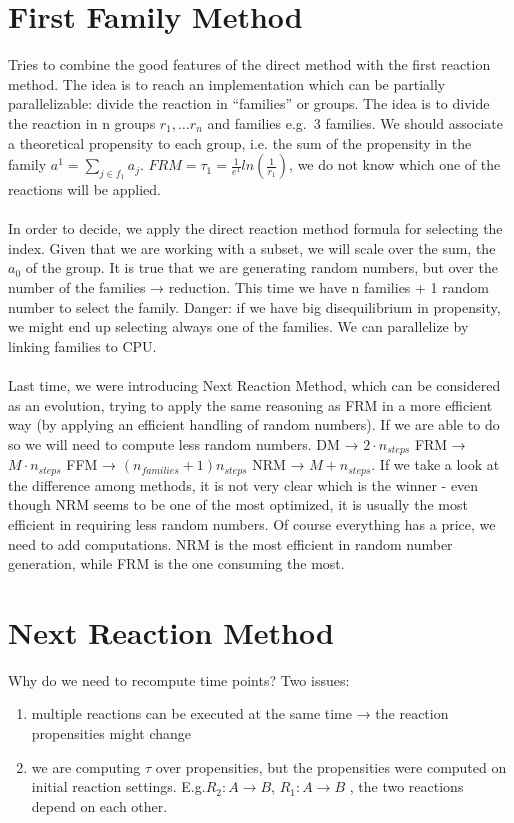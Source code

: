\section{First Family Method}
Tries to combine the good features of the direct method with the first reaction method.
The idea is to reach an implementation which can be partially parallelizable: divide the reaction in ``families'' or groups.
The idea is to divide the reaction in n groups $r_1,…r_n$ and families e.g.~3 families.
We should associate a theoretical propensity to each group, i.e. the sum of the propensity in the family $a^1=\sum_{j\in f_1}a_j$.
$FRM= \tau_1= \frac{1}{e^1}ln(\frac{1}{r_1})$, we do not know which one of the reactions will be applied.
\\
\\
\noindent
In order to decide, we apply the direct reaction method formula for selecting the index.
Given that we are working with a subset, we will scale over the sum, the $a_0$ of the group.
It is true that we are generating random numbers, but over the number of the families → reduction.
This time we have n families + 1 random number to select the family.
Danger: if we have big disequilibrium in propensity, we might end up selecting always one of the families.
We can parallelize by linking families to CPU.
\\
\\
\noindent
Last time, we were introducing Next Reaction Method, which can be considered as an evolution, trying to apply the same reasoning as FRM in a more efficient way (by applying an efficient handling of random numbers).
If we are able to do so we will need to compute less random numbers.
DM → $2 \cdot n_{steps}$ FRM → $M \cdot n_{steps}$ FFM → $(n_{families}+ 1)n_{steps}$ NRM → $M+n_{steps}$.
If we take a look at the difference among methods, it is not very clear which is the winner - even though NRM seems to be one of the most optimized, it is usually the most efficient in requiring less random numbers.
Of course everything has a price, we need to add computations.
NRM is the most efficient in random number generation, while FRM is the one consuming the most.

\section{Next Reaction Method}
Why do we need to recompute time points? Two issues:

\begin{enumerate}
  \def\labelenumi{\arabic{enumi}.}
  \item multiple reactions can be executed at the same time → the reaction propensities might change \item we are computing $\tau$ over propensities, but the propensities were computed on initial reaction settings.
  E.g.$R_2:A \rightarrow B$, $R_1 : A \rightarrow B$ , the two reactions depend on each other.
\end{enumerate}

